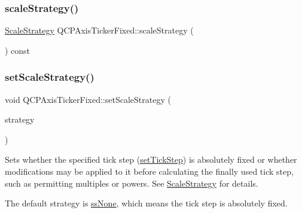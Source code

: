 \mbox{\label{class_q_c_p_axis_ticker_fixed_a20fd8fcb257f63449f8913335ad57e45}} 
\subsubsection{\texorpdfstring{scaleStrategy()}{scaleStrategy()}}
{\footnotesize\ttfamily \mbox{\hyperlink{class_q_c_p_axis_ticker_fixed_a15b3d38b935d404b1311eb85cfb6a439}{Scale\+Strategy}} Q\+C\+P\+Axis\+Ticker\+Fixed\+::scale\+Strategy (\begin{DoxyParamCaption}{ }\end{DoxyParamCaption}) const\hspace{0.3cm}{\ttfamily [inline]}}

\mbox{\label{class_q_c_p_axis_ticker_fixed_acbc7c9bcd80b3dc3edee5f0519d301f6}} 
\subsubsection{\texorpdfstring{setScaleStrategy()}{setScaleStrategy()}}
{\footnotesize\ttfamily void Q\+C\+P\+Axis\+Ticker\+Fixed\+::set\+Scale\+Strategy (\begin{DoxyParamCaption}\item[{\mbox{\hyperlink{class_q_c_p_axis_ticker_fixed_a15b3d38b935d404b1311eb85cfb6a439}{Q\+C\+P\+Axis\+Ticker\+Fixed\+::\+Scale\+Strategy}}}]{strategy }\end{DoxyParamCaption})}

Sets whether the specified tick step (\mbox{\hyperlink{class_q_c_p_axis_ticker_fixed_a4bc83d85a4f81d4abdd3fa5042d7b833}{set\+Tick\+Step}}) is absolutely fixed or whether modifications may be applied to it before calculating the finally used tick step, such as permitting multiples or powers. See \mbox{\hyperlink{class_q_c_p_axis_ticker_fixed_a15b3d38b935d404b1311eb85cfb6a439}{Scale\+Strategy}} for details.

The default strategy is \mbox{\hyperlink{class_q_c_p_axis_ticker_fixed_a15b3d38b935d404b1311eb85cfb6a439a6621275677a05caa0de204ae3956b85f}{ss\+None}}, which means the tick step is absolutely fixed. \mbox{\label{class_q_c_p_axis_ticker_fixed_a4bc83d85a4f81d4abdd3fa5042d7b833}} 
